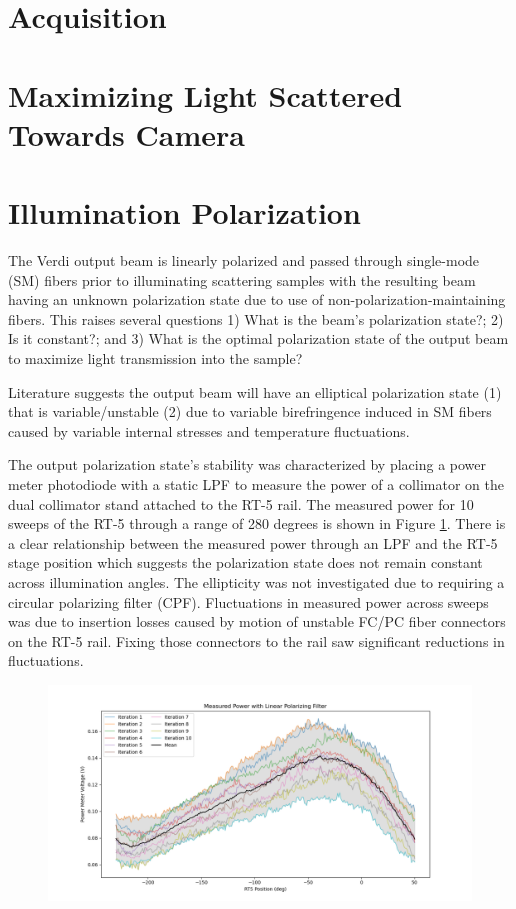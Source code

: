 \section{Acquisition}

\section{Maximizing Light Scattered Towards Camera}

\section{Illumination Polarization}
The Verdi output beam is linearly polarized and passed through single-mode (SM) fibers prior to illuminating scattering samples with the resulting beam having an unknown polarization state due to use of non-polarization-maintaining fibers. This raises several questions 1) What is the beam's polarization state?; 2) Is it constant?; and 3) What is the optimal polarization state of the output beam to maximize light transmission into the sample?

Literature suggests the output beam will have an elliptical polarization state (1) that is variable/unstable (2) due to variable birefringence induced in SM fibers caused by variable internal stresses and temperature fluctuations.

The output polarization state's stability was characterized by placing a power meter photodiode with a static LPF to measure the power of a collimator on the dual collimator stand attached to the RT-5 rail. The measured power for 10 sweeps of the RT-5 through a range of 280 degrees is shown in Figure \ref{fig:lpfpwr_RT5}. There is a clear relationship between the measured power through an LPF and the RT-5 stage position which suggests the polarization state does not remain constant across illumination angles. The ellipticity was not investigated due to requiring a circular polarizing filter (CPF). Fluctuations in measured power across sweeps was due to insertion losses caused by motion of unstable FC/PC fiber connectors on the RT-5 rail. Fixing those connectors to the rail saw significant reductions in fluctuations.

\begin{figure}
    \centering
    \includegraphics[width=\linewidth]{figures/LPFpwr_vs_RT5.png}
    \caption{}
    \label{fig:lpfpwr_RT5}
\end{figure}


